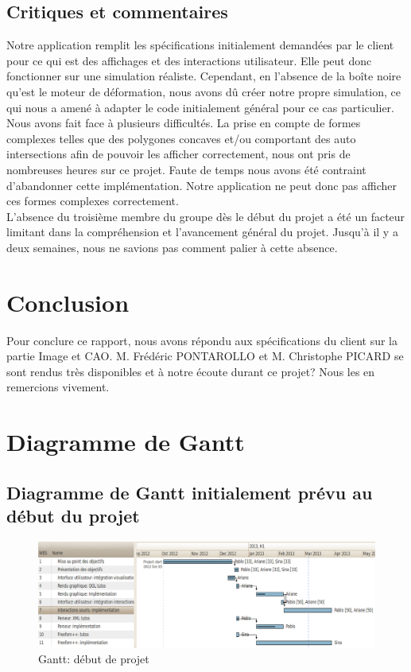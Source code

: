 \documentclass[a4paper, 11pt]{article}
\begin{document}
\subsection{Critiques et commentaires}
Notre application remplit les spécifications initialement demandées par le client pour ce qui est des affichages et des interactions utilisateur.
Elle peut donc fonctionner sur une simulation réaliste.
Cependant, en l'absence de la boîte noire qu'est le moteur de déformation, nous avons dû créer notre propre simulation, ce qui nous a amené à adapter le code initialement général pour ce cas particulier.\\
Nous avons fait face à plusieurs difficultés.
La prise en compte de formes complexes telles que des polygones concaves et/ou comportant des auto intersections afin de pouvoir les afficher correctement, nous ont pris de nombreuses heures sur ce projet.
Faute de temps nous avons été contraint d'abandonner cette implémentation.
Notre application ne peut donc pas afficher ces formes complexes correctement.\\
L'absence du troisième membre du groupe dès le début du projet a été un facteur limitant dans la compréhension et l'avancement général du projet.
Jusqu'à il y a deux semaines, nous ne savions pas comment palier à cette absence.\\

\section{Conclusion}
Pour conclure ce rapport, nous avons répondu aux spécifications du client sur la partie Image et CAO.
M. Frédéric PONTAROLLO et M. Christophe PICARD se sont rendus très disponibles et à notre écoute durant ce projet?
Nous les en remercions vivement.

\section{Diagramme de Gantt}
\subsection{Diagramme de Gantt initialement prévu au début du projet}
\begin{figure}[H]
    \includegraphics[width=\textwidth]{img/gantt.png}
    \caption{Gantt: début de projet}
\end{figure}
\end{document}

